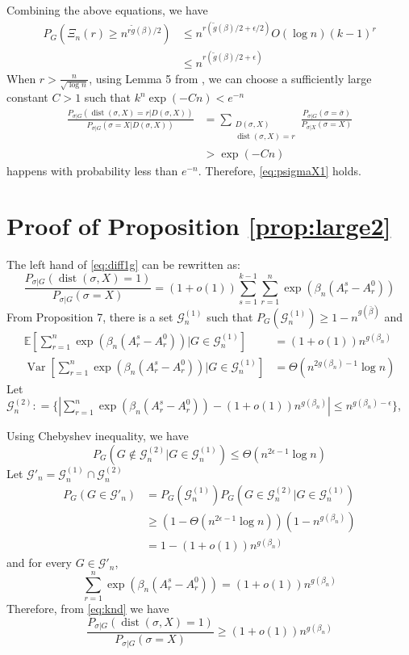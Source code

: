 \documentclass[journal]{IEEEtran}
\newcommand{\cG}{\mathcal{G}}
\DeclareMathOperator{\Var}{Var}
\DeclareMathOperator{\dist}{dist}
\begin{document}
Combining the above equations, we have
\begin{align*}
P_{G}(\Xi_n(r) \geq n^{r \tilde{g}(\beta) /2}) &\leq  n^{r(\tilde{g}(\beta)/2 + \epsilon/2)} O(\log n) (k-1)^r\\
&\leq n^{r(\tilde{g}(\beta)/2 + \epsilon)}
\end{align*}
When $r>\frac{n}{\sqrt{\log n}}$, using Lemma 5 from \cite{sibmmc}, we can choose a sufficiently large constant $C>1$
such that $k^n\exp(-Cn) < e^{-n}$
\begin{align*}
\frac{P_{\sigma|G}(\dist(\sigma, X)=r | D(\sigma, X))}
{P_{\sigma|G}(\sigma=X | D(\sigma, X))} &= \sum_{\substack{D(\sigma, X) \\ \dist(\sigma, X)=r}} \frac{P_{\sigma | G}(\sigma = \bar{\sigma}) }{P_{\sigma | X}(\sigma = X)} \\
&> \exp(-Cn)
\end{align*}
happens with probability less than $e^{-n}$. Therefore, \eqref{eq:psigmaX1} holds.

\section*{Proof of Proposition \ref{prop:large2}}
The left hand of \eqref{eq:diff1g} can be rewritten as:
\begin{equation}\label{eq:knd}
	\frac{P_{\sigma|G}(\dist(\sigma, X)=1)}
{P_{\sigma|G}(\sigma=X)}= (1+o(1))\sum_{s=1}^{k-1}\sum_{r=1}^n \exp(\beta_n (A_r^s - A_r^0))
\end{equation}
From Proposition 7, there is a set $\cG^{(1)}_n$ such that $P_G(\cG^{(1)}_n) \geq 1-n^{g(\bar{\beta})}$
and
\begin{align}
\mathbb{E}[\sum_{r=1}^n \exp(\beta_n (A_r^s - A_r^0)) | G \in \cG^{(1)}_n] &= (1+o(1))n^{g(\beta_n)} \\
\Var[\sum_{r=1}^n \exp(\beta_n (A_r^s - A_r^0)) | G \in \cG^{(1)}_n] &= \Theta(n^{2g(\beta_n)-1}\log n)
\end{align}
Let $\cG^{(2)}_n: = \{|\sum_{r=1}^n \exp(\beta_n (A_r^s - A_r^0)) - (1+o(1))n^{g(\beta_n)}  | \leq n^{g(\beta_n) - \epsilon} \}$,

Using Chebyshev inequality, we have
\begin{equation*}
P_G(G \not\in \cG^{(2)}_n \Big\vert  G \in \cG^{(1)}_n) \leq \Theta(n^{2\epsilon - 1} \log n) 
\end{equation*}
Let $\cG'_n = \cG^{(1)}_n \cap \cG^{(2)}_n$
\begin{align*}
P_G(G \in \cG'_n) &= P_G(\cG^{(1)}_n) P_G(G \in \cG_n^{(2)} | G \in \cG_n^{(1)}) \\
& \geq (1-\Theta(n^{2\epsilon - 1} \log n))(1-n^{g(\beta_n)}) \\
&= 1-(1+o(1))n^{g(\beta_n)}
\end{align*}
and for every $G\in\cG'_n$,
\begin{equation*}
\sum_{r=1}^n \exp(\beta_n (A_r^s - A_r^0)) = (1+o(1)) n^{g(\beta_n)}
\end{equation*}
Therefore, from \eqref{eq:knd} we have
\begin{equation*}
	\frac{P_{\sigma|G}(\dist(\sigma, X)=1)}
{P_{\sigma|G}(\sigma=X)} \geq (1+o(1)) n^{g(\beta_n)}
\end{equation*}
\end{document}

